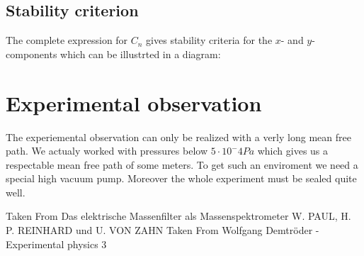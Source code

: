 \documentclass[a4paper, parskip=half]{scrartcl}
\begin{document}
\subsection{Stability criterion}
The complete expression for $C_n$ gives stability criteria for the $x$- and $y$-components which can be illustrted in a diagram: 


\section{Experimental observation}
The experiemental observation can only be realized with a verly long mean free path. We actualy worked with pressures below $5 \cdot 10^-4 Pa$ which gives us a respectable mean free path of some meters. To get such an enviroment we need a special high vacuum pump. Moreover the whole experiment must be sealed quite well.    
\begin{thebibliography}{999}
 Taken From Das elektrische Massenfilter als Massenspektrometer W. PAUL, H. P. REINHARD und U. VON ZAHN
 Taken From Wolfgang Demtröder - Experimental physics 3

\end{thebibliography}
\end{document}

